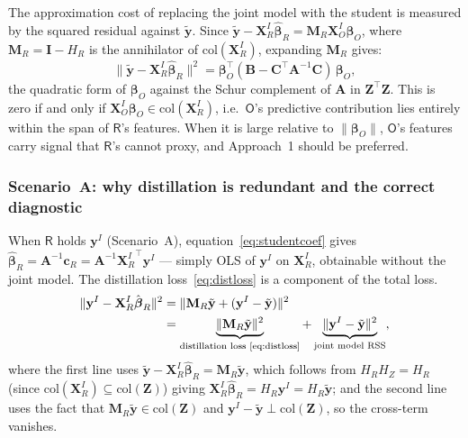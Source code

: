 \documentclass[12pt]{article}
\theoremstyle{definition}
\theoremstyle{plain}
\newcommand{\bXRI}{\mathbf{X}_{R}^{I}}
\newcommand{\bXOI}{\mathbf{X}_{O}^{I}}
\newcommand{\bZ}{\mathbf{Z}}
\newcommand{\by}{\mathbf{y}}
\newcommand{\bbeta}{\boldsymbol{\beta}}
\newcommand{\bA}{\mathbf{A}}
\newcommand{\bB}{\mathbf{B}}
\newcommand{\bC}{\mathbf{C}}
\newcommand{\bcR}{\mathbf{c}_{R}}
\newcommand{\Party}[1]{\textsf{#1}}
\begin{document}
The approximation cost of replacing the joint model with the student is
measured by the squared residual against $\tilde{\mathbf{y}}$. Since
$\tilde{\mathbf{y}} - \bXRI\hat{\bbeta}_{R} = \mathbf{M}_{R}\bXOI\bbeta_{O}$,
where $\mathbf{M}_{R} = \mathbf{I} - H_{R}$ is the annihilator of
$\mathrm{col}(\bXRI)$, expanding $\mathbf{M}_{R}$ gives:
\begin{equation}
  \lVert \tilde{\mathbf{y}} - \bXRI\hat{\bbeta}_{R} \rVert^{2}
  = \boldsymbol{\beta}_{O}^{\top}(\bB - \bC^{\top}\bA^{-1}\bC)\,\bbeta_{O},
  \label{eq:distloss}
\end{equation}
the quadratic form of $\bbeta_{O}$ against the Schur complement of $\bA$
in $\bZ^{\top}\bZ$. This is zero if and only if
$\bXOI\bbeta_{O} \in \mathrm{col}(\bXRI)$, i.e.\ $\Party{O}$'s
predictive contribution lies entirely within the span of $\Party{R}$'s
features. When it is large relative to $\lVert\bbeta_{O}\rVert$,
$\Party{O}$'s features carry signal that $\Party{R}$'s cannot proxy, and
Approach~1 should be preferred. 

\subsubsection*{Scenario~A: why distillation is redundant and the correct
diagnostic}
\label{sec:inf:equiv}

When $\Party{R}$ holds $\by^{I}$ (Scenario~A), equation~\eqref{eq:studentcoef}
gives $\hat{\bbeta}_{R} = \bA^{-1}\bcR = \bA^{-1}{\bXRI}^{\top}\by^{I}$
--- simply OLS of $\by^{I}$ on $\bXRI$, obtainable without the joint
model. The distillation loss~\eqref{eq:distloss} is a component of the total loss. 
\begin{align}
  \lVert \by^{I} - \bXRI\hat{\bbeta}_{R} \rVert^{2}
  &= \lVert \mathbf{M}_{R}\tilde{\mathbf{y}}
     + (\by^{I} - \tilde{\mathbf{y}}) \rVert^{2}
  \label{eq:rss_step1}\\
  &= \underbrace{\lVert \mathbf{M}_{R}\tilde{\mathbf{y}} \rVert^{2}}_{\text{distillation loss \eqref{eq:distloss}}}
   + \underbrace{\lVert \by^{I} - \tilde{\mathbf{y}} \rVert^{2}}_{\text{joint model RSS}},
  \label{eq:rss_decomp}
\end{align}
where the first line uses $\tilde{\mathbf{y}} - \bXRI\hat{\bbeta}_{R} =
\mathbf{M}_{R}\tilde{\mathbf{y}}$, which follows from $H_{R}H_{Z} = H_{R}$
(since $\mathrm{col}(\bXRI) \subseteq \mathrm{col}(\bZ)$) giving
$\bXRI\hat{\bbeta}_{R} = H_{R}\by^{I} = H_{R}\tilde{\mathbf{y}}$;
and the second line uses the fact that
$\mathbf{M}_{R}\tilde{\mathbf{y}} \in \mathrm{col}(\bZ)$
and $\by^{I} - \tilde{\mathbf{y}} \perp \mathrm{col}(\bZ)$,
so the cross-term vanishes.
\end{document}
